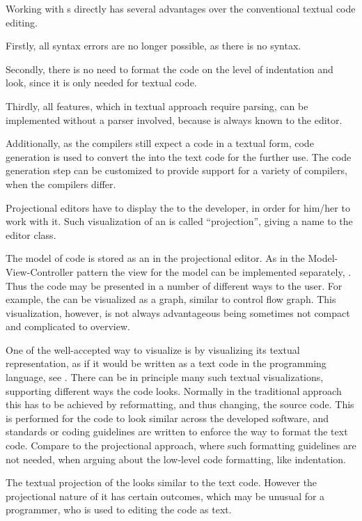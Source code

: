 Working with s directly has several advantages over the conventional textual code editing.

Firstly, all syntax errors are no longer possible, as there is no syntax. 

Secondly, there is no need to format the code on the level of indentation and look, since it is only
needed for textual code.

Thirdly, all features, which in textual approach require parsing, can be implemented without a parser involved, because  is always known to the editor.

Additionally, as the compilers still expect a code in a textual form, code generation is used to
convert the  into the text code for the further use. The code generation step can be 
customized to provide support for a variety of compilers, when the compilers differ.

Projectional editors have to display the  to the developer, in order for him/her to work with it. Such visualization
of an  is called ``projection'', giving a name to the editor class.

The model of code is stored as an  in the projectional editor. As in the Model-View-Controller pattern the view for
the model can be implemented separately, \cite{GOF95}. Thus the code may be presented in a number of different ways to the user. For example, the  can be visualized as a graph, similar to control flow graph. This visualization, however, is not always advantageous being sometimes not compact and
complicated to overview.


One of the well-accepted way to visualize  is by visualizing its textual representation, as if
it would be written as a text code in the programming language, see . There can be in  principle many such textual visualizations, supporting different ways the code looks. Normally in 
the traditional approach this has to be achieved by reformatting, and thus changing, the source code.
This is performed for the code to look similar across the developed software, and standards or coding 
guidelines are written to enforce the way to format the text code. Compare to the projectional approach,
where such formatting guidelines are not needed, when arguing about the low-level code formatting,
like indentation.

The textual projection of the  looks similar to the text code. However the projectional 
nature of it has certain outcomes, which may be unusual for a programmer, who is used to editing
the code as text.

